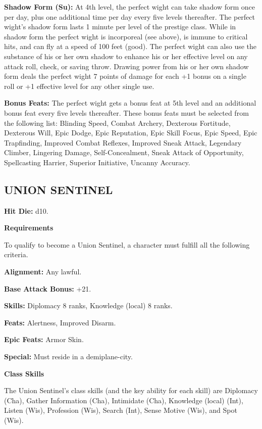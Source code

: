 \documentclass{article}
\begin{document}
\textbf{Shadow Form (Su):} At 4th level, the perfect wight can take shadow form 
once per day, plus one additional time per day every five levels thereafter. The 
perfect wight's shadow form lasts 1 minute per level of the prestige class. While 
in shadow form the perfect wight is incorporeal (see above), is immune to critical 
hits, and can fly at a speed of 100 feet (good). The perfect wight can also use 
the substance of his or her own shadow to enhance his or her effective level on 
any attack roll, check, or saving throw. Drawing power from his or her own shadow 
form deals the perfect wight 7 points of damage for each +1 bonus on a single roll 
or +1 effective level for any other single use. 

\textbf{Bonus Feats:} The perfect wight gets a bonus feat at 5th level and an additional 
bonus feat every five levels thereafter. These bonus feats must be selected from 
the following list: Blinding Speed, Combat Archery, Dexterous Fortitude, Dexterous 
Will, Epic Dodge, Epic Reputation, Epic Skill Focus, Epic Speed, Epic Trapfinding, 
Improved Combat Reflexes, Improved Sneak Attack, Legendary Climber, Lingering Damage, 
Self-Concealment, Sneak Attack of Opportunity, Spellcasting Harrier, Superior Initiative, 
Uncanny Accuracy. 

\vspace{12pt}
\subsection*{{\LARGE{}UNION SENTINEL }}

\textbf{Hit Die:} d10. 

\textbf{Requirements}

To qualify to become a Union Sentinel, a character must fulfill all the following 
criteria. 

\textbf{Alignment:} Any lawful. 

\textbf{Base Attack Bonus:} +21. 

\textbf{Skills:} Diplomacy 8 ranks, Knowledge (local) 8 ranks. 

\textbf{Feats:} Alertness, Improved Disarm. 

\textbf{Epic Feats:} Armor Skin. 

\textbf{Special:} Must reside in a demiplane-city. 

\textbf{Class Skills}

The Union Sentinel's class skills (and the key ability for each skill) are Diplomacy 
(Cha), Gather Information (Cha), Intimidate (Cha), Knowledge (local) (Int), Listen 
(Wis), Profession (Wis), Search (Int), Sense Motive (Wis), and Spot (Wis). 
\end{document}

